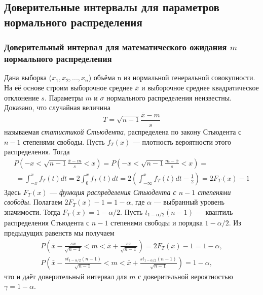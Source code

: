 \subsection{Доверительные интервалы для параметров нормального распределения}
\subsubsection{Доверительный интервал для математического ожидания $m$ нормального распределения}
Дана выборка ($x_{1},x_{2}, ... ,x_{n}$) объёма n из нормальной генеральной совокупности. На её основе строим выборочное среднее $\bar{x}$ и выборочное среднее квадратическое отклонение $s$. Параметры $m$ и $\sigma$ нормального распределения неизвестны.
\newline
Доказано, что случайная величина
\begin{equation}
    T = \sqrt{n - 1}\frac{\bar{x} - m}{s}
    \label{T}
\end{equation}
называемая \textit{статистикой Стьюдента}, распределена по закону Стьюдента с $n-1$ степенями свободы. Пусть $f_{T}(x)$ — плотность вероятности этого распределения. Тогда 
\begin{multline}
    P\left(-x < \sqrt{n - 1}\frac{\bar{x} - m}{s} < x \right) = 
    P\left(-x < \sqrt{n - 1}\frac{m - \bar{x}}{s} < x \right) = \\\
    = \int_{-x}^{x}{f_{T}(t)d t} = 2 \int_{0}^{x}{f_{T}(t)d t} = 
    2\left(  \int_{-\infty}^{x}{f_{T}(t)d t} - \frac{1}{2} \right) = 2F_{T}(x) - 1
    \label{P_f_t}
\end{multline}
Здесь $F_{T}(x)$ — \textit{функция распределения Стьюдента с $n-1$ степенями свободы}.
\newline
Полагаем $2F_{T}(x)-1 = 1-\alpha$, где $\alpha$ — выбранный уровень значимости. Тогда $F_{T}(x) = 1-\alpha/2$. Пусть $t_{1-\alpha/2}(n-1)$ — квантиль распределения Стьюдента с $n-1$ степенями свободы и порядка $1-\alpha/2$. Из предыдущих равенств мы получаем 
\begin{equation}
    \begin{split}
         P\left(\bar{x} - \frac{sx}{\sqrt{n-1}} < m <  \bar{x} + \frac{sx}{\sqrt{n-1}}\right) = 2F_{T}(x) - 1 = 1 - \alpha,  \\
         P\left(\bar{x} - \frac{st_{1-\alpha/2}(n−1)}{\sqrt{n-1}} < m <  \bar{x} + \frac{st_{1-\alpha/2}(n−1)}{\sqrt{n-1}}\right)= 1 - \alpha, 
    \label{P_m}     
    \end{split}
\end{equation}
что и даёт доверительный интервал для $m$ с доверительной вероятностью $\gamma = 1-\alpha$.


